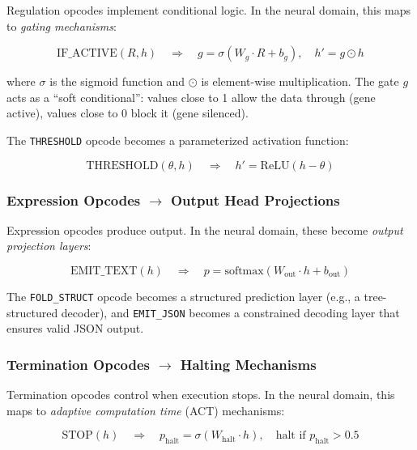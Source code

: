 Regulation opcodes implement conditional logic. In the neural domain, this maps to \emph{gating mechanisms}:

\begin{equation}
\text{IF\_ACTIVE}(R, h) \quad\Longrightarrow\quad g = \sigma(W_g \cdot R + b_g), \quad h' = g \odot h
\end{equation}

where $\sigma$ is the sigmoid function and $\odot$ is element-wise multiplication. The gate $g$ acts as a ``soft conditional'': values close to 1 allow the data through (gene active), values close to 0 block it (gene silenced).

The \texttt{THRESHOLD} opcode becomes a parameterized activation function:

\begin{equation}
\text{THRESHOLD}(\theta, h) \quad\Longrightarrow\quad h' = \text{ReLU}(h - \theta)
\end{equation}

\subsubsection{Expression Opcodes $\to$ Output Head Projections}

Expression opcodes produce output. In the neural domain, these become \emph{output projection layers}:

\begin{equation}
\text{EMIT\_TEXT}(h) \quad\Longrightarrow\quad p = \text{softmax}(W_{\text{out}} \cdot h + b_{\text{out}})
\end{equation}

The \texttt{FOLD\_STRUCT} opcode becomes a structured prediction layer (e.g., a tree-structured decoder), and \texttt{EMIT\_JSON} becomes a constrained decoding layer that ensures valid JSON output.

\subsubsection{Termination Opcodes $\to$ Halting Mechanisms}

Termination opcodes control when execution stops. In the neural domain, this maps to \emph{adaptive computation time} (ACT) mechanisms:

\begin{equation}
\text{STOP}(h) \quad\Longrightarrow\quad p_{\text{halt}} = \sigma(W_{\text{halt}} \cdot h), \quad \text{halt if } p_{\text{halt}} > 0.5
\end{equation}

